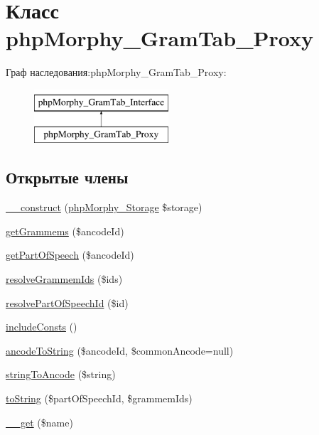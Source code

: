 \hypertarget{classphpMorphy__GramTab__Proxy}{
\section{Класс phpMorphy\_\-GramTab\_\-Proxy}
\label{classphpMorphy__GramTab__Proxy}
}
Граф наследования:phpMorphy\_\-GramTab\_\-Proxy:\begin{figure}[H]
\begin{center}
\leavevmode
\includegraphics[height=2.000000cm]{classphpMorphy__GramTab__Proxy}
\end{center}
\end{figure}
\subsection*{Открытые члены}
\begin{DoxyCompactItemize}
\item 
\hyperlink{classphpMorphy__GramTab__Proxy_ae9c072bf9fb1fb9b228444e8977fbcb0}{\_\-\_\-construct} (\hyperlink{classphpMorphy__Storage}{phpMorphy\_\-Storage} \$storage)
\item 
\hyperlink{classphpMorphy__GramTab__Proxy_a7adcc0b870c03ae9f72fd6676db566ea}{getGrammems} (\$ancodeId)
\item 
\hyperlink{classphpMorphy__GramTab__Proxy_a2174f92920c2b1ecf389151544c420db}{getPartOfSpeech} (\$ancodeId)
\item 
\hyperlink{classphpMorphy__GramTab__Proxy_a149918ff2c4a69c4071774cbcc084411}{resolveGrammemIds} (\$ids)
\item 
\hyperlink{classphpMorphy__GramTab__Proxy_ab30f0b1362cdd680c106cfb0dab91880}{resolvePartOfSpeechId} (\$id)
\item 
\hyperlink{classphpMorphy__GramTab__Proxy_aa7cff7f5aa795a57f4d0647d301f860f}{includeConsts} ()
\item 
\hyperlink{classphpMorphy__GramTab__Proxy_a45d0bba0a9a6b54b8ca45d58b14a881b}{ancodeToString} (\$ancodeId, \$commonAncode=null)
\item 
\hyperlink{classphpMorphy__GramTab__Proxy_a202e52acc00adef12d78fd5247965540}{stringToAncode} (\$string)
\item 
\hyperlink{classphpMorphy__GramTab__Proxy_a814397885edca06e05dddd2947d4f2c6}{toString} (\$partOfSpeechId, \$grammemIds)
\item 
\hyperlink{classphpMorphy__GramTab__Proxy_a3633446d5bbc9647580f3940a74358c7}{\_\-\_\-get} (\$name)
\end{DoxyCompactItemize}
